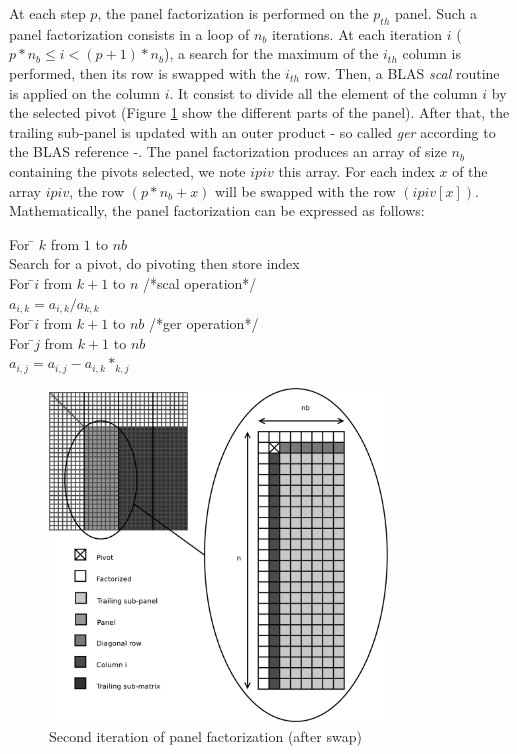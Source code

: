  
At each step $p$, the panel factorization is performed on the $p_{th}$ panel. Such a panel factorization consists in a loop of $n_b$ iterations. At each iteration $i$ ($p*n_b \leq i < (p+1)*n_b$), a search for the maximum of the $i_{th}$ column is performed, then its row is swapped with the $i_{th}$ row.
Then, a BLAS \textit{scal} routine is applied on the column $i$. It consist to divide all the element of the column $i$ by the selected pivot (Figure \ref{fig:panel} show the different parts of the panel).
After that, the trailing sub-panel is updated with an outer product - so called \textit{ger} according to the BLAS reference -. The panel factorization produces an array of size $n_b$ containing the pivots selected, we note $ipiv$ this array. For each index $x$ of the array $ipiv$, the row $(p*n_b + x)$ will be swapped with the row $(ipiv[x])$.
Mathematically, the panel factorization can be expressed as follows:\\
\begin{tabbing}
For \= $k$ from $1$ to $nb$\\
\> Search for a pivot, do pivoting then store index\\
\> For \=$i$ from $k+1$ to $n$    /*scal operation*/\\
\>\> $a_{i,k} = a_{i,k}/a_{k,k}$\\
\> For \=$i$ from $k+1$ to $nb$   /*ger operation*/\\
\>\> For \=$j$ from $k+1$ to $nb$\\
\>\>\> $a_{i,j} = a_{i,j}-a_{i,k}*_{k,j}$\\
\end{tabbing}

\begin{figure}[!ht]
\centering
\includegraphics[width=0.8\textwidth]{figures/panel.pdf}
\caption{Second iteration of panel factorization (after swap)\label{fig:panel}}
\end{figure}

